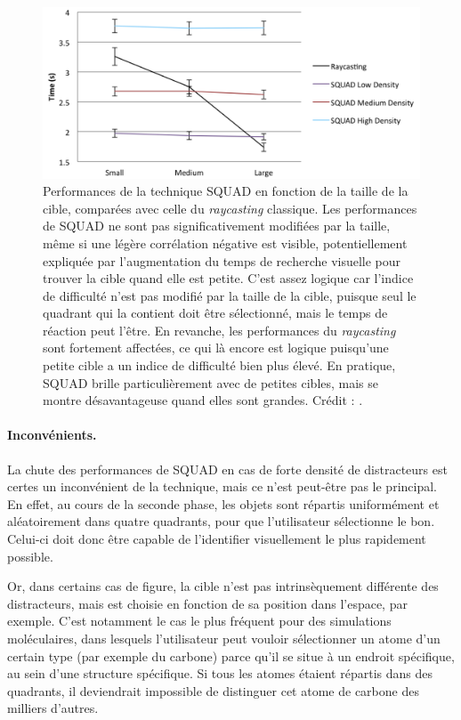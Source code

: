 	\begin{figure}[ht]
		\centering
		\includegraphics[width=\textwidth]{figures/ch2/squadRecap}
		\caption[SQUAD --- Résultats : taille]{Performances de la technique SQUAD en fonction de la taille de la cible, comparées avec celle du \emph{raycasting} classique. Les performances de SQUAD ne sont pas significativement modifiées par la taille, même si une légère corrélation négative est visible, potentiellement expliquée par l'augmentation du temps de recherche visuelle pour trouver la cible quand elle est petite. C'est assez logique car l'indice de difficulté n'est pas modifié par la taille de la cible, puisque seul le quadrant qui la contient doit être sélectionné, mais le temps de réaction peut l'être. En revanche, les performances du \emph{raycasting} sont fortement affectées, ce qui là encore est logique puisqu'une petite cible a un indice de difficulté bien plus élevé. En pratique, SQUAD brille particulièrement avec de petites cibles, mais se montre désavantageuse quand elles sont grandes. Crédit : \cite{kopper2011rapid}.}
		\label{fig:squadRecap}
	\end{figure}
	
	\paragraph{Inconvénients.}
	La chute des performances de SQUAD en cas de forte densité de distracteurs est certes un inconvénient de la technique, mais ce n'est peut-être pas le principal. En effet, au cours de la seconde phase, les objets sont répartis uniformément et aléatoirement dans quatre quadrants, pour que l'utilisateur sélectionne le bon. Celui-ci doit donc être capable de l'identifier visuellement le plus rapidement possible.
	
	Or, dans certains cas de figure, la cible n'est pas intrinsèquement différente des distracteurs, mais est choisie en fonction de sa position dans l'espace, par exemple. C'est notamment le cas le plus fréquent pour des simulations moléculaires, dans lesquels l'utilisateur peut vouloir sélectionner un atome d'un certain type (par exemple du carbone) parce qu'il se situe à un endroit spécifique, au sein d'une structure spécifique. Si tous les atomes étaient répartis dans des quadrants, il deviendrait impossible de distinguer cet atome de carbone des milliers d'autres.
	
